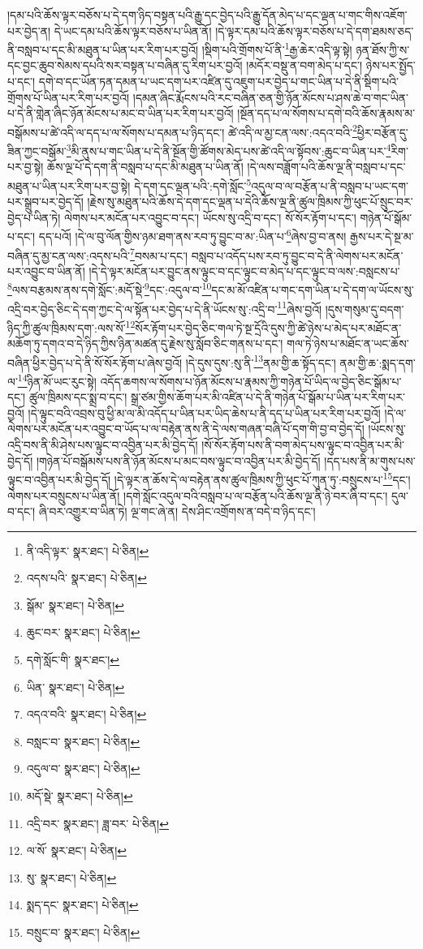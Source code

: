 །དམ་པའི་ཆོས་ལྟར་བཅོས་པ་དེ་དག་ཉིད་བསྟན་པའི་རྒྱུ་དང་བྱེད་པའི་རྒྱུ་དོན་མེད་པ་དང་ལྡན་པ་གང་གིས་འཇོག་པར་བྱེད་ན། དེ་ཡང་དམ་པའི་ཆོས་ལྟར་བཅོས་པ་ཡིན་ནོ། །དེ་ལྟར་དམ་པའི་ཆོས་ལྟར་བཅོས་པ་དེ་དག་ཐམས་ཅད་ནི་བསླབ་པ་དང་མི་མཐུན་པ་ཡིན་པར་རིག་པར་བྱའོ། །སྡིག་པའི་གྲོགས་པོ་ནི་\footnote{ནི་འདི་ལྟར་  སྣར་ཐང་།  པེ་ཅིན། }རྒྱ་ཆེར་འདི་ལྟ་སྟེ། ཉན་ཐོས་ཀྱི་ས་དང་བྱང་ཆུབ་སེམས་དཔའི་སར་བསྟན་པ་བཞིན་དུ་རིག་པར་བྱའོ། །མདོར་བསྡུ་ན་བག་མེད་པ་དང་། ཉེས་པར་སྤྱོད་པ་དང་། དགེ་བ་དང་ཡོན་ཏན་དམན་པ་ཡང་དག་པར་འཛིན་དུ་འཇུག་པར་བྱེད་པ་གང་ཡིན་པ་དེ་ནི་སྡིག་པའི་གྲོགས་པོ་ཡིན་པར་རིག་པར་བྱའོ། །དམན་ཞིང་རྨོངས་པའི་རང་བཞིན་ཅན་གྱི་ཉོན་མོངས་པ་ཤས་ཆེ་བ་གང་ཡིན་པ་དེ་ནི་གླེན་ཞིང་ཉོན་མོངས་པ་མང་བ་ཡིན་པར་རིག་པར་བྱའོ། །སྔོན་དད་པ་ལ་སོགས་པ་དགེ་བའི་ཆོས་རྣམས་མ་བསྒོམས་པ་ཚེ་འདི་ལ་དད་པ་ལ་སོགས་པ་དམན་པ་ཉིད་དང་། ཚེ་འདི་ལ་མྱ་ངན་ལས་:འདའ་བའི་\footnote{འདས་པའི་  སྣར་ཐང་།  པེ་ཅིན། }ཕྱིར་བརྩོན་དུ་ཟིན་ཀྱང་བསྒོམ་\footnote{སྒོམ་  སྣར་ཐང་།  པེ་ཅིན། }མི་ནུས་པ་གང་ཡིན་པ་དེ་ནི་སྔོན་གྱི་ཚོགས་མེད་པས་ཚེ་འདི་ལ་སྟོབས་:ཆུང་བ་ཡིན་པར་\footnote{ཆུང་བར་  སྣར་ཐང་།  པེ་ཅིན། }རིག་པར་བྱ་སྟེ། ཆོས་ལྔ་པོ་དེ་དག་ནི་བསླབ་པ་དང་མི་མཐུན་པ་ཡིན་ནོ། །དེ་ལས་བཟློག་པའི་ཆོས་ལྔ་ནི་བསླབ་པ་དང་མཐུན་པ་ཡིན་པར་རིག་པར་བྱ་སྟེ། དེ་དག་དང་ལྡན་པའི་:དགེ་སློང་\footnote{དགེ་སློང་གི་  སྣར་ཐང་། }འདུལ་བ་ལ་བརྩོན་པ་ནི་བསླབ་པ་ཡང་དག་པར་སྒྲུབ་པར་བྱེད་དོ། །རྗེས་སུ་མཐུན་པའི་ཆོས་དེ་དག་དང་ལྡན་པ་དེའི་ཆོས་ལྔ་ནི་ཚུལ་ཁྲིམས་ཀྱི་ཕུང་པོ་སྲུང་བར་བྱེད་པ་ཡིན་ཏེ། ལེགས་པར་མངོན་པར་འབྱུང་བ་དང་། ཡོངས་སུ་འདྲི་བ་དང་། སོ་སོར་རྟོག་པ་དང་། གཉེན་པོ་སྒོམ་པ་དང་། དད་པའོ། །དེ་ལ་བུ་ལོན་གྱིས་ཉམ་ཐག་ནས་རབ་ཏུ་བྱུང་བ་མ་:ཡིན་པ་\footnote{ཡིན་  སྣར་ཐང་།  པེ་ཅིན། }ཞེས་བྱ་བ་ནས། རྒྱས་པར་དེ་སྔ་མ་བཞིན་དུ་མྱ་ངན་ལས་:འདས་པའི་\footnote{འདའ་བའི་  སྣར་ཐང་།  པེ་ཅིན། }བསམ་པ་དང་། བསླབ་པ་འདོད་པས་རབ་ཏུ་བྱུང་བ་དེ་ནི་ལེགས་པར་མངོན་པར་འབྱུང་བ་ཡིན་ནོ། །དེ་དེ་ལྟར་མངོན་པར་བྱུང་ནས་ལྟུང་བ་དང་ལྟུང་བ་མེད་པ་དང་ལྟུང་བ་ལས་:བསླངས་པ་\footnote{བསླང་བ་  སྣར་ཐང་།  པེ་ཅིན། }ལས་བརྩམས་ནས་དགེ་སློང་:མདོ་སྡེ་\footnote{འདུལ་བ་  སྣར་ཐང་།  པེ་ཅིན། }དང་:འདུལ་བ་\footnote{མདོ་སྡེ་  སྣར་ཐང་།  པེ་ཅིན། }དང་མ་མོ་འཛིན་པ་གང་དག་ཡིན་པ་དེ་དག་ལ་ཡོངས་སུ་འདྲི་བར་བྱེད་ཅིང་དེ་དག་ཀྱང་དེ་ལ་སྟོན་པར་བྱེད་པ་དེ་ནི་ཡོངས་སུ་:འདྲི་བ་\footnote{འདྲི་བར་  སྣར་ཐང་། ཟླ་བར་  པེ་ཅིན། }ཞེས་བྱའོ། །དུས་གསུམ་དུ་བདག་ཉིད་ཀྱི་ཚུལ་ཁྲིམས་དག་:ལས་སོ་\footnote{ལ་སོ་  སྣར་ཐང་།  པེ་ཅིན། }སོར་རྟོག་པར་བྱེད་ཅིང་གལ་ཏེ་སྔ་དྲོའི་དུས་ཀྱི་ཚེ་ཉེས་པ་མེད་པར་མཐོང་ན་མཆོག་ཏུ་དགའ་བ་དེ་ཉིད་ཀྱིས་ཉིན་མཚན་དུ་རྗེས་སུ་སློབ་ཅིང་གནས་པ་དང་། གལ་ཏེ་ཉེས་པ་མཐོང་ན་ཡང་ཆོས་བཞིན་ཕྱིར་བྱེད་པ་དེ་ནི་སོ་སོར་རྟོག་པ་ཞེས་བྱའོ། །དེ་དུས་དུས་:སུ་ནི་\footnote{སུ་  སྣར་ཐང་།  པེ་ཅིན། }ནམ་གྱི་ཆ་སྟོད་དང་། ནམ་གྱི་ཆ་:སྨད་དག་ལ་\footnote{སྨད་དང་  སྣར་ཐང་།  པེ་ཅིན། }ཉིན་མོ་ཡང་རུང་སྟེ། འདོད་ཆགས་ལ་སོགས་པ་ཉོན་མོངས་པ་རྣམས་ཀྱི་གཉེན་པོ་ཡིད་ལ་བྱེད་ཅིང་སྒོམ་པ་དང་། ཚུལ་ཁྲིམས་དང་སྨྲ་བ་དང་། སྒྲ་ཙམ་གྱིས་ཆོག་པར་མི་འཛིན་པ་དེ་ནི་གཉེན་པོ་སྒོམ་པ་ཡིན་པར་རིག་པར་བྱའོ། །དེ་ལྟུང་བའི་འབྲས་བུ་ཕྱི་མ་ལ་མི་འདོད་པ་ཡིན་པར་ཡིད་ཆེས་པ་ནི་དད་པ་ཡིན་པར་རིག་པར་བྱའོ། །དེ་ལ་ལེགས་པར་མངོན་པར་འབྱུང་བ་ཡོད་པ་ལ་བརྟེན་ནས་ནི་དེ་ལས་གཞན་བཞི་པོ་དག་གི་བྱ་བ་བྱེད་དོ། །ཡོངས་སུ་འདྲི་བས་ནི་མི་ཤེས་པས་ལྟུང་བ་འབྱིན་པར་མི་བྱེད་དོ། །སོ་སོར་རྟོག་པས་ནི་བག་མེད་པས་ལྟུང་བ་འབྱིན་པར་མི་བྱེད་དོ། །གཉེན་པོ་བསྒོམས་པས་ནི་ཉོན་མོངས་པ་མང་བས་ལྟུང་བ་འབྱིན་པར་མི་བྱེད་དོ། །དད་པས་ནི་མ་གུས་པས་ལྟུང་བ་འབྱིན་པར་མི་བྱེད་དོ། །དེ་ལྟར་ན་ཆོས་དེ་ལ་བརྟེན་ནས་ཚུལ་ཁྲིམས་ཀྱི་ཕུང་པོ་ཀུན་ཏུ་:བསྲུངས་པ་\footnote{བསྲུང་བ་  སྣར་ཐང་།  པེ་ཅིན། }དང་། ལེགས་པར་བསྲུངས་པ་ཡིན་ནོ། །དགེ་སློང་འདུལ་བའི་བསླབ་པ་ལ་བརྩོན་པའི་ཆོས་ལྔ་ནི་ཉེ་བར་ཞི་བ་དང་། དུལ་བ་དང་། ཞི་བར་འགྱུར་བ་ཡིན་ཏེ། ལྔ་གང་ཞེ་ན། དེས་ཤིང་འགྲོགས་ན་བདེ་བ་ཉིད་དང་། 